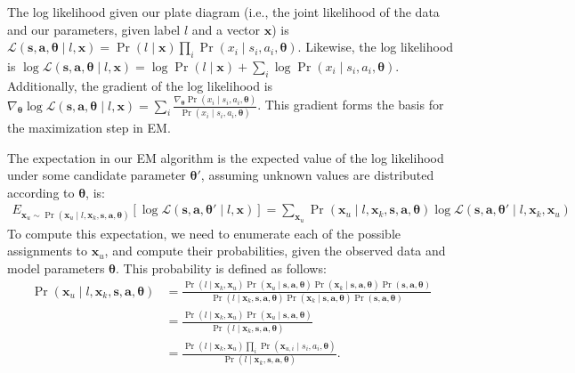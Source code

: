 The log likelihood given our plate diagram (i.e., the joint likelihood
of the data and our parameters, given label $l$ and a vector $\bm{x}$)
is
%
%
$\mathcal{L}(\bm{s}, \bm{a}, \bm{\theta} \mid l, \bm{x}) 
= \Pr(l \mid \bm{x}) \prod_i \Pr(x_i \mid s_i, a_i, \bm{\theta})$.
%
\noindent
Likewise, the log likelihood is
%
$\log\mathcal{L}(\bm{s}, \bm{a}, \bm{\theta} \mid l, \bm{x}) = 
\log \Pr(l \mid \bm{x}) + \sum_i \log \Pr(x_i \mid s_i, a_i, \bm{\theta})$.
%
\noindent
Additionally, the gradient of the log likelihood is
%
$\nabla_{\bm{\theta}} \log\mathcal{L}(\bm{s}, \bm{a}, \bm{\theta} \mid l, \bm{x}) = \sum_i  \frac{\nabla_{\bm{\theta}} \Pr(x_i \mid s_i, a_i, \bm{\theta})}{\Pr(x_i \mid s_i, a_i, \bm{\theta})}$.
%
This gradient forms the basis for the maximization step in EM.

The expectation in our EM algorithm is the expected value of the log
likelihood under some candidate parameter $\bm{\theta}'$, assuming
unknown values are distributed according to $\bm{\theta}$, is:
%
\begin{align*}
E_{\bm{x}_u \sim \Pr(\bm{x}_u \mid l, \bm{x}_k, \bm{s}, \bm{a}, \bm{\theta})} \left[ \log\mathcal{L}(\bm{s}, \bm{a}, \bm{\theta}' \mid l, \bm{x}) \right]
= \sum_{\bm{x}_u} \Pr(\bm{x}_u \mid l, \bm{x}_k, \bm{s}, \bm{a}, \bm{\theta}) \log\mathcal{L}(\bm{s}, \bm{a}, \bm{\theta}' \mid l, \bm{x}_k, \bm{x}_u)
\end{align*}
%
To compute this expectation, we need to enumerate each of the
possible assignments to $\bm{x}_u$, and compute their probabilities,
given the observed data and model parameters $\bm{\theta}$.  This
probability is defined as follows:
%
\begin{align*}
\Pr(\bm{x}_u \mid l, \bm{x}_k, \bm{s}, \bm{a}, \bm{\theta}) &= \frac{\Pr(l \mid \bm{x}_k, \bm{x}_u) \Pr(\bm{x}_u \mid \bm{s}, \bm{a}, \bm{\theta}) \Pr(\bm{x}_k \mid \bm{s}, \bm{a}, \bm{\theta}) \Pr(\bm{s}, \bm{a}, \bm{\theta})}{\Pr(l \mid \bm{x}_k, \bm{s}, \bm{a}, \bm{\theta}) \Pr(\bm{x}_k \mid \bm{s}, \bm{a}, \bm{\theta}) \Pr(\bm{s}, \bm{a}, \bm{\theta})} \\
 &= \frac{\Pr(l \mid \bm{x}_k, \bm{x}_u) \Pr(\bm{x}_u \mid \bm{s}, \bm{a}, \bm{\theta}) }{\Pr(l \mid \bm{x}_k, \bm{s}, \bm{a}, \bm{\theta})} \\
 &= \frac{\Pr(l \mid \bm{x}_k, \bm{x}_u) \prod_i \Pr(\bm{x}_{u,i} \mid s_i, a_i, \bm{\theta}) }{\Pr(l \mid \bm{x}_k, \bm{s}, \bm{a}, \bm{\theta})}. 
\end{align*}

